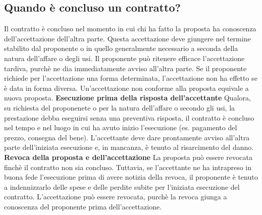 \subsection{Quando è concluso un contratto?}
Il contratto è concluso nel momento in cui chi ha fatto la proposta ha conoscenza
dell'accettazione dell'altra parte. Questa accettazione deve giungere nel termine stabilito dal
proponente o in quello generalmente necessario a seconda della natura dell'affare o degli usi.\newline
Il proponente può ritenere efficace l'accettazione tardiva, purchè ne dia immediatamente avviso all'altra
parte. Se il  proponente richiede per l'accettazione una forma determinata, l'accettazione non ha
effetto se è data in forma diversa. Un'accettazione non conforme alla proposta equivale a nuova proposta. \newline
\textbf{Esecuzione prima della risposta dell'accettante}\newline
Qualora, su richiesta del proponenete o per la natura dell'affare o secondo gli usi, la prestazione debba
eseguirsi senza una preventiva risposta, il contratto è concluso nel tempo e nel luogo in cui ha avuto
inizio l'esecuzione (es. pagamento del prezzo, consegna del bene). L'accettante deve dare prontamente avviso
all'altra parte dell'iniziata esecuzione e, in mancanza, è tenuto al risarcimento del danno. \newline
\textbf{Revoca della proposta e dell'accettazione}\newline
La proposta può essere revocata finchè il contratto non sia concluso. Tuttavia, se l'accettante
ne ha intrapreso in buona fede l'esecuzione prima di avere notizia della revoca, il proponente è tenuto a
indennizzarlo delle spese e delle perdite subite per l'iniziata esecuzione del contratto.\newline
L'accettazione può essere revocata, purchè la revoca giunga a conoscenza del proponente prima dell'accettazione.

